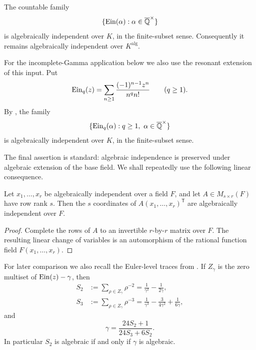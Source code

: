 \begin{theorem}
\label{thm:input-independence}
The countable family
\[
 \{\operatorname{Ein}(\alpha):\alpha\in\overline{\mathbb Q}^\times\}
\]
is algebraically independent over \(K\), in the finite-subset sense.
Consequently it remains algebraically independent over
\(K^{\mathrm{alg}}\).
\end{theorem}

For the incomplete-Gamma application below we also use the resonant
extension of this input.  Put
\[
 \operatorname{Ein}_q(z)=\sum_{n\ge1}\frac{(-1)^{n-1}z^n}{n^q n!}
 \qquad(q\ge1).
\]
By \cite[Thm.~1.4]{KEIO2026I}, the family
\begin{equation}\label{eq:resonant-input}
 \{\operatorname{Ein}_q(\alpha):q\ge1,\ \alpha\in\overline{\mathbb Q}^\times\}
\end{equation}
is algebraically independent over \(K\), in the finite-subset sense.

The final assertion is standard: algebraic independence is preserved under
algebraic extension of the base field.  We shall repeatedly use the following
linear consequence.

\begin{lemma}
\label{lem:linear-images}
Let \(x_1,\ldots,x_r\) be algebraically independent over a field \(F\), and
let \(A\in M_{s\times r}(F)\) have row rank \(s\).  Then the \(s\) coordinates
of \(A(x_1,\ldots,x_r)^{\mathsf T}\) are algebraically independent over \(F\).
\end{lemma}

\begin{proof}
Complete the rows of \(A\) to an invertible \(r\)-by-\(r\) matrix over \(F\).
The resulting linear change of variables is an automorphism of the rational
function field \(F(x_1,\ldots,x_r)\).
\end{proof}

For later comparison we also recall the Euler-level traces from
\cite[Thm.~14.5]{KEIO2026I}.  If \(Z_\gamma\) is the zero multiset of
\(\operatorname{Ein}(z)-\gamma\), then
\begin{align}
 S_2&:=\sum_{\rho\in Z_\gamma}\rho^{-2}
 =\frac1{\gamma^2}-\frac1{2\gamma},\label{eq:S2}\\
 S_3&:=\sum_{\rho\in Z_\gamma}\rho^{-3}
 =\frac1{\gamma^3}-\frac3{4\gamma^2}+\frac1{6\gamma},\label{eq:S3}
\end{align}
and
\begin{equation}\label{eq:gamma-recovery}
 \gamma=\frac{24S_2+1}{24S_3+6S_2}.
\end{equation}
In particular \(S_2\) is algebraic if and only if \(\gamma\) is algebraic.

